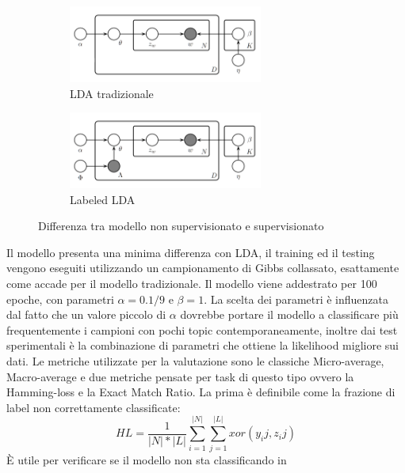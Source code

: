 \documentclass[technote]{IEEEtran}
\begin{document}
\begin{figure}[H]
\vspace{-5mm}
  \begin{subfigure}[b]{0.45\textwidth}
  \centering
    \includegraphics[width=0.7\textwidth]{images/lda}
    \caption{LDA tradizionale}
  \end{subfigure}
   \hfill
  \begin{subfigure}[b]{0.45\textwidth}
  \centering
    \includegraphics[width=0.7\textwidth]{images/llda}
    \caption{Labeled LDA}
  \end{subfigure}
  \caption{Differenza tra modello non supervisionato e supervisionato}
  \label{fig_llda}
\end{figure}
Il modello presenta una minima differenza con LDA, il training ed il testing vengono eseguiti utilizzando un campionamento di Gibbs collassato, esattamente come accade per il modello tradizionale. Il modello viene addestrato per 100 epoche, con parametri $ \alpha = 0.1 / 9 $ e $ \beta = 1 $. La scelta dei parametri è influenzata dal fatto che un valore piccolo di $ \alpha $ dovrebbe portare il modello a classificare più frequentemente i campioni con pochi topic contemporaneamente, inoltre dai test sperimentali è la combinazione di parametri che ottiene la likelihood migliore sui dati.
Le metriche utilizzate per la valutazione sono le classiche Micro-average, Macro-average e due metriche pensate per task di questo tipo ovvero la Hamming-loss \cite{6772729} e la Exact Match Ratio. La prima è definibile come la frazione di label non correttamente classificate:
\begin{equation}
HL=\frac{1}{|N|*|L|}\sum_{i=1}^{|N|}\sum_{j=1}^{|L|}xor(y_ij, z_ij)
\end{equation}
\` E utile per verificare se il modello non sta classificando in
\end{document}
